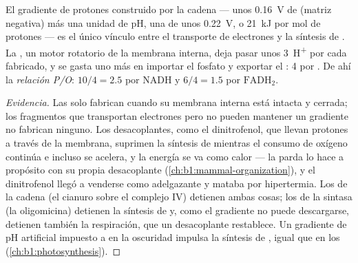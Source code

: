 \begin{theorem}\label{thm:b1:respiration-fermentation:chemiosmosis}
El gradiente de protones construido por la cadena --- unos \qty{0.16}{V} de
 (matriz negativa) más una unidad de pH, una
\emph{} de unos \qty{0.22}{V}, o \qty{21}{kJ} por mol de
protones --- es el único vínculo entre el transporte de electrones y la
síntesis de . La , un motor rotatorio de la membrana interna,
deja pasar unos \qty{3}{H^+} por cada  fabricado, y se gasta uno más en
importar el fosfato y exportar el : 4 por . De ahí la \emph{relación
P/O}: $10/4 = 2.5$  por NADH y $6/4 = 1.5$ por
$\mathrm{FADH_2}$.
\end{theorem}
\begin{proof}[Evidencia]
Las  solo fabrican  cuando su membrana interna está intacta y
cerrada; los fragmentos que transportan electrones pero no pueden mantener
un gradiente no fabrican ninguno. Los desacoplantes, como el dinitrofenol,
que llevan protones a través de la membrana, suprimen la síntesis de 
mientras el consumo de oxígeno continúa e incluso se acelera, y la energía
se va como calor --- la  parda lo hace a propósito con su propia
 desacoplante (\cref{ch:b1:mammal-organization}), y el dinitrofenol
llegó a venderse como adelgazante y mataba por hipertermia. Los 
de la cadena (el cianuro sobre el complejo IV) detienen ambas cosas; los
 de la sintasa (la oligomicina) detienen la síntesis de  y,
como el gradiente no puede descargarse, detienen también la respiración, que
un desacoplante restablece. Un gradiente de pH artificial impuesto a
 en la oscuridad impulsa la síntesis de , igual que en los
 (\cref{ch:b1:photosynthesis}).
\end{proof}

